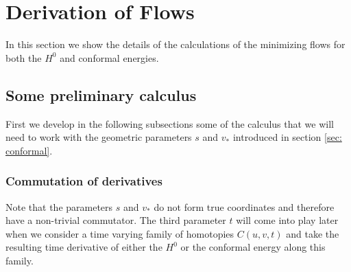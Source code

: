 \documentclass[twoside,a4paper,english]{article}
\def\v{{v_*}}
\begin{document}
\section{Derivation of Flows}

In this section we show the details of the calculations of the
minimizing flows for both the $H^0$ and conformal energies.

\subsection{Some preliminary calculus}

First we develop in the following subsections some of the calculus
that we will need to work with the geometric parameters $s$
and $\v$ introduced in section \ref{sec: conformal}.

\subsubsection{Commutation of derivatives}

Note that the parameters $s$ and $\v$ do not form true coordinates
and therefore have a non-trivial commutator. The third parameter
$t$ will come into play later when we consider a time varying family of
homotopies $C(u,v,t)$ and take the resulting time derivative of either
the $H^0$ or the conformal energy along this family.
\end{document}
